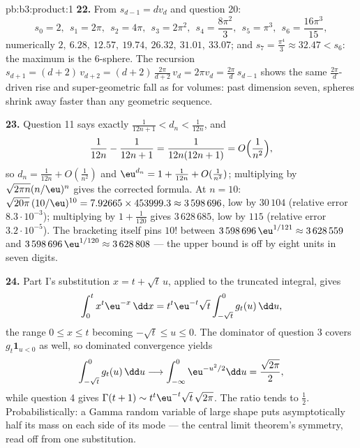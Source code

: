 \begin{solution}{pb:b3:product:1}
\textbf{22.} From $s_{d-1} = dv_d$ and question 20:
\[
s_0 = 2,\ \ s_1 = 2\pi,\ \ s_2 = 4\pi,\ \ s_3 = 2\pi^2,\ \
s_4 = \frac{8\pi^2}3,\ \ s_5 = \pi^3,\ \ s_6 =
\frac{16\pi^3}{15},
\]
numerically $2,\ 6.28,\ 12.57,\ 19.74,\ 26.32,\ 31.01,\
33.07$; and $s_7 = \frac{\pi^4}3 \approx 32.47 < s_6$: the
maximum is the $6$-sphere. The recursion $s_{d+1} =
(d+2)\,v_{d+2} = (d+2)\,\frac{2\pi}{d+2}\,v_d = 2\pi v_d =
\frac{2\pi}d\,s_{d-1}$ shows the same $\frac{2\pi}d$-driven
rise and super-geometric fall as for volumes: past dimension
seven, spheres shrink away faster than any geometric
sequence.

\textbf{23.} Question 11 says exactly $\frac1{12n+1} < d_n <
\frac1{12n}$, and
\[
\frac1{12n} - \frac1{12n+1} = \frac1{12n(12n+1)} =
O\Bigl(\frac1{n^2}\Bigr),
\]
so $d_n = \frac1{12n} + O(\frac1{n^2})$ and $\eu^{d_n} = 1 +
\frac1{12n} + O(\frac1{n^2})$; multiplying by
$\sqrt{2\pi n}(n/\eu)^n$ gives the corrected formula. At $n =
10$: $\sqrt{20\pi}\,(10/\eu)^{10} = 7.92665 \times 453999.3
\approx 3\,598\,696$, low by $30\,104$ (relative error
$8.3\cdot10^{-3}$); multiplying by $1 + \frac1{120}$ gives
$3\,628\,685$, low by $115$ (relative error
$3.2\cdot10^{-5}$). The bracketing itself pins $10!$ between
$3\,598\,696\,\eu^{1/121} \approx 3\,628\,559$ and
$3\,598\,696\,\eu^{1/120} \approx 3\,628\,808$ --- the upper
bound is off by eight units in seven digits.

\textbf{24.} Part I's substitution $x = t + \sqrt t\,u$,
applied to the truncated integral, gives
\[
\int_0^{t} x^{t}\eu^{-x}\,\dd x
= t^{t}\eu^{-t}\sqrt t\int_{-\sqrt t}^{0} g_t(u)\,\dd u ,
\]
the range $0 \leq x \leq t$ becoming $-\sqrt t \leq u \leq
0$. The dominator of question 3 covers $g_t\mathbf 1_{u < 0}$
as well, so dominated convergence yields
\[
\int_{-\sqrt t}^{0}g_t(u)\,\dd u \longrightarrow
\int_{-\infty}^{0}\eu^{-u^2/2}\dd u = \frac{\sqrt{2\pi}}2 ,
\]
while question 4 gives $\Gamma(t+1) \sim
t^t\eu^{-t}\sqrt t\,\sqrt{2\pi}$. The ratio tends to
$\frac12$. Probabilistically: a Gamma random variable of
large shape puts asymptotically half its mass on each side
of its mode --- the central limit theorem's symmetry, read
off from one substitution.


\end{solution}
